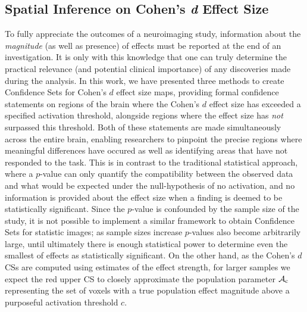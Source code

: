\subsection{Spatial Inference on Cohen's \textit{d} Effect Size}
To fully appreciate the outcomes of a neuroimaging study, information about the \textit{magnitude} (as well as presence) of effects must be reported at the end of an investigation. It is only with this knowledge that one can truly determine the practical relevance (and potential clinical importance) of any discoveries made during the analysis. In this work, we have presented three methods to create Confidence Sets for Cohen's $d$ effect size maps, providing formal confidence statements on regions of the brain where the Cohen's $d$ effect size has exceeded a specified activation threshold, alongside regions where the effect size has \textit{not} surpassed this threshold. Both of these statements are made simultaneously across the entire brain, enabling researchers to pinpoint the precise regions where meaningful differences have occured as well as identifying areas that have not responded to the task. This is in contrast to the traditional statistical approach, where a $p$-value can only quantify the compatibility between the observed data and what would be expected under the null-hypothesis of no activation, and no information is provided about the effect size when a finding is deemed to be statistically significant. Since the $p$-value is confounded by the sample size of the study, it is not possible to implement a similar framework to obtain Confidence Sets for statistic images; as sample sizes increase $p$-values also become arbitrarily large, until ultimately there is enough statistical power to determine even the smallest of effects as statistically significant. On the other hand, as the Cohen's $d$ CSs are computed using estimates of the effect strength, for larger samples we expect the red upper CS to closely approximate the population parameter $\operatorname{\mathcal{A}_{c}}$ representing the set of voxels with a true population effect magnitude above a purposeful activation threshold $c$.

